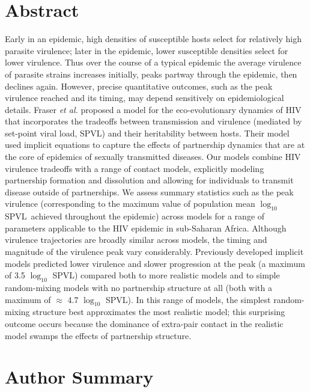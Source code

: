 \documentclass[10pt,letterpaper]{article}
\newcommand{\Lspvl}{$\log_{10}$ SPVL}
\begin{document}
\section*{Abstract}
Early in an epidemic, high densities of susceptible hosts
select for relatively high parasite virulence; later in the epidemic,
lower susceptible densities select for lower virulence.
Thus over the course of a typical epidemic the average virulence 
of parasite strains increases initially,
peaks partway through the epidemic, then declines again.
However, precise quantitative outcomes, such as the peak virulence reached
and its timing, may depend sensitively on epidemiological details. 
Fraser \emph{et al.}
proposed a model for the eco-evolutionary
dynamics of HIV that incorporates
the tradeoffs between transmission and virulence (mediated by
set-point viral load, SPVL) and their heritability between
hosts. Their model used implicit equations to
capture the effects of partnership dynamics that are at the core of 
epidemics of sexually transmitted diseases. 
Our models combine HIV virulence tradeoffs with a range of
contact models, explicitly modeling partnership formation and
dissolution and allowing for individuals to transmit disease outside
of partnerships. We assess summary statistics such as the peak virulence
(corresponding to the maximum value of population mean \Lspvl\ achieved throughout the epidemic) across
models for a range of 
parameters applicable to the HIV epidemic in sub-Saharan Africa.
Although virulence trajectories are broadly similar
across models, the timing and magnitude of the 
virulence peak vary
considerably.
Previously developed implicit models predicted 
lower virulence and slower progression
at the peak (a maximum of 3.5 \Lspvl) compared both to more realistic models
and to simple random-mixing models with no partnership structure
at all (both with a maximum of $\approx$ 4.7 \Lspvl).
In this range of models, the simplest random-mixing structure best
approximates the most realistic model; this
surprising outcome occurs because the dominance of extra-pair
contact in the realistic model swamps the effects of
partnership structure.

\section*{Author Summary}
\end{document}
